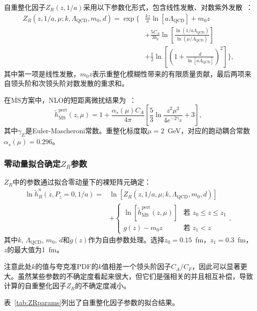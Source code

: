 \documentclass[12pt,a4paper]{ctexart}
\theoremstyle{definition}
\newcommand{\MS}{\overline{\text{MS}}}
\newcommand{\hB}{\tilde{h}_B}
\newcommand{\hpert}{\tilde{h}^{\text{pert}}}
\newcommand{\Pz}{P_z}
\newcommand{\QCD}{\Lambda_{\text{QCD}}}
\newcommand{\alphas}{\alpha_s}
\newcommand{\CA}{C_A}
\newcommand{\CF}{C_F}
\begin{document}
自重整化因子$Z_R(z, 1/a)$采用以下参数化形式，包含线性发散、对数紫外发散~\cite{Chen2025gluon}：
\begin{equation}\label{eq:ZR}
\begin{aligned}
Z_R(z, 1/a, \mu; k, \QCD, m_0, d) = \exp\Bigg\{&\frac{kz}{a}\ln[a\QCD] + m_0 z \\
&+ \frac{5\CA}{3b_0} \ln\!\left[\frac{\ln(1/a\QCD)}{\ln(\mu/\QCD)}\right] \\
&+ \frac{1}{2}\ln\!\left[\left(1 + \frac{d}{\ln[a\QCD]}\right)^2\right]\Bigg\},
\end{aligned}
\end{equation}
其中第一项是线性发散，$m_0 z$表示重整化模糊性带来的有限质量贡献，最后两项来自领头阶和次领头阶对数发散的重求和。

在$\MS$方案中，NLO的短距离微扰结果为~\cite{Balitsky:2019krj}：
\begin{equation}\label{eq:MSbar}
    \hpert_{\MS}(z, \mu) = 1 + \frac{\alphas(\mu) \CA}{4\pi}\left[\frac{5}{3}\ln\frac{z^2\mu^2}{4e^{-2\gamma_E}} + 3\right],
\end{equation}
其中$\gamma_E$是Euler-Mascheroni常数。重整化标度取$\mu = 2$~GeV，对应的跑动耦合常数$\alphas(\mu) = 0.296$。

\subsubsection{零动量拟合确定$Z_R$参数}

$Z_R$中的参数通过拟合零动量下的裸矩阵元确定：
\begin{equation}\label{eq:ZR_fit}
\begin{aligned}
\ln \hB^n(z, \Pz=0, 1/a) = &\ln[Z_R(z, 1/a, \mu; k, \QCD, m_0, d)] \\
&+ \begin{cases}
\ln\!\left[\hpert_{\MS}(z, \mu)\right] & \text{若 } z_0 \leq z \leq z_1 \\[5pt]
g(z) - m_0 z & \text{若 } z_1 < z
\end{cases},
\end{aligned}
\end{equation}
其中$k$, $\QCD$, $m_0$, $d$和$g(z)$作为自由参数处理。选择$z_0 = 0.15$~fm，$z_1 = 0.3$~fm，$z$的最大值为1~fm。

注意此处$k$的值与夸克准PDF的$k$值相差一个领头阶因子$\CA/\CF$，因此可以显著更大。虽然某些参数的不确定度看起来很大，但它们是强相关的并且相互补偿，导致计算的自重整化因子$Z_R$的不确定度减小。

表~\ref{tab:ZRparams}列出了自重整化因子参数的拟合结果。
\end{document}
